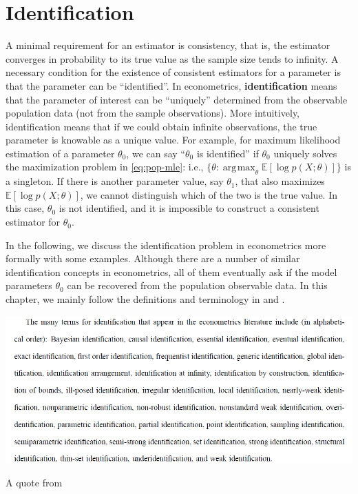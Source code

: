 \documentclass[10.5pt, A4paper, openany, uplatex]{book}
\newcommand{\E}{\mathbb{E}}
\numberwithin{equation}{section}
\DeclareMathOperator*{\argmax}{\arg\!\max}
\begin{document}

\chapter{Identification}\label{chap:identification}

A minimal requirement for an estimator is consistency, that is, the estimator converges in probability to its true value as the sample size tends to infinity. 
A necessary condition for the existence of consistent estimators for a parameter is that the parameter can be ``identified''.
In econometrics, \textbf{identification} means that the parameter of interest can be ``uniquely'' determined from the observable population data (not from the sample observations).
More intuitively, identification means that if we could obtain infinite observations, the true parameter is knowable as a unique value.
For example, for maximum likelihood estimation of a parameter $\theta_0$, we can say ``$\theta_0$ is identified'' if $\theta_0$ uniquely solves the maximization problem in \eqref{eq:pop-mle}: i.e., $\{\theta : \argmax_\theta \E[\log p(X; \theta)]\}$ is a singleton.
If there is another parameter value, say $\theta_1$, that also maximizes $\E [\log p(X; \theta)]$, we cannot distinguish which of the two is the true value.
In this case, $\theta_0$ is not identified, and it is impossible to construct a consistent estimator for $\theta_0$.

In the following, we discuss the identification problem in econometrics more formally with some examples.
Although there are a number of similar identification concepts in econometrics, all of them eventually ask if the model parameters $\theta_0$ can be recovered from the population observable data.
In this chapter, we mainly follow the definitions and terminology in \cite{hurwicz1950generalization} and \cite{matzkin2013nonparametric}.
\begin{screen}
\begin{center}
	\includegraphics[width=14cm]{identifications.png}

	\footnotesize
	A quote from \cite{lewbel2019identification}
	\normalsize
\end{center}
\end{screen}
\end{document}
